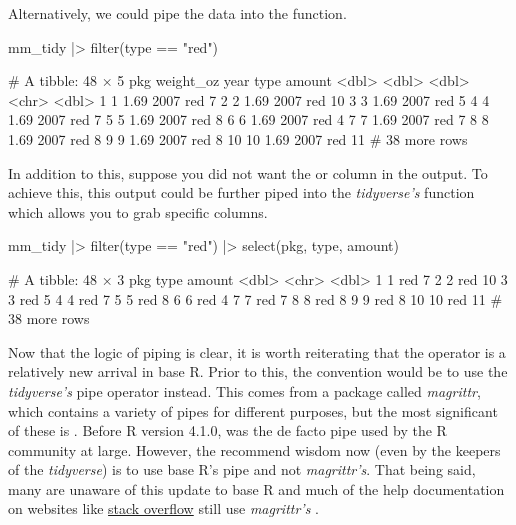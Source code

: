 \noindent
Alternatively, we could pipe the data into the  function.

\begin{inR}
mm_tidy |> filter(type == "red")
\end{inR}
\begin{outR}
# A tibble: 48 × 5
     pkg weight_oz  year type  amount
   <dbl>     <dbl> <dbl> <chr>  <dbl>
 1     1      1.69  2007 red        7
 2     2      1.69  2007 red       10
 3     3      1.69  2007 red        5
 4     4      1.69  2007 red        7
 5     5      1.69  2007 red        8
 6     6      1.69  2007 red        4
 7     7      1.69  2007 red        7
 8     8      1.69  2007 red        8
 9     9      1.69  2007 red        8
10    10      1.69  2007 red       11
# 38 more rows
\end{outR}

In addition to this, suppose you did not want the  or  column in the output. To achieve this, this output could be further piped into the \textit{tidyverse's}  function which allows you to grab specific columns.

\begin{inR}
mm_tidy |> 
  filter(type == "red") |>
  select(pkg, type, amount)
\end{inR}
\begin{outR}
# A tibble: 48 × 3
     pkg type  amount
   <dbl> <chr>  <dbl>
 1     1 red        7
 2     2 red       10
 3     3 red        5
 4     4 red        7
 5     5 red        8
 6     6 red        4
 7     7 red        7
 8     8 red        8
 9     9 red        8
10    10 red       11
# 38 more rows
\end{outR}

Now that the logic of piping is clear, it is worth reiterating that the \R{|>} operator is a relatively new arrival in base R. Prior to this, the convention would be to use the \textit{tidyverse's} pipe operator \R{\%>\%} instead. This comes from a package called \textit{magrittr}, which contains a variety of pipes for different purposes, but the most significant of these is \R{\%>\%}. Before R version  4.1.0, \R{\%>\%} was the de facto pipe used by the R community at large. However, the recommend wisdom now (even by the keepers of the \textit{tidyverse}) is to use base R's pipe and not \textit{magrittr's}. That being said, many are unaware of this update to base R and much of the help documentation on websites like \href{https://stackoverflow.com/}{stack overflow} still use \textit{magrittr's} \R{\%>\%}.

